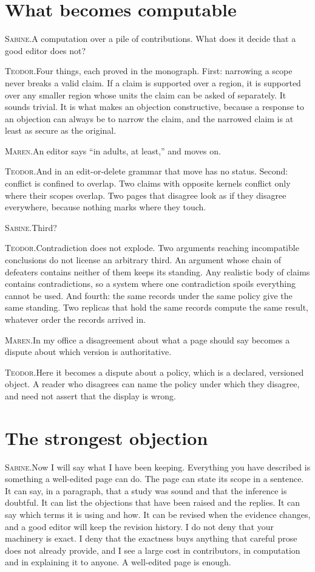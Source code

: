 \documentclass[11pt]{article}
\newcommand{\say}[2]{\par\noindent\textsc{#1.}\enspace #2\par}
\newcommand{\MA}[1]{\say{Maren}{#1}}
\newcommand{\TE}[1]{\say{Teodor}{#1}}
\newcommand{\SA}[1]{\say{Sabine}{#1}}
\begin{document}
\section{What becomes computable}

\SA{A computation over a pile of contributions. What does it decide that a good editor does not?}

\TE{Four things, each proved in the monograph. First: narrowing a scope never breaks a valid claim. If a claim is supported over a region, it is supported over any smaller region whose units the claim can be asked of separately. It sounds trivial. It is what makes an objection constructive, because a response to an objection can always be to narrow the claim, and the narrowed claim is at least as secure as the original.}

\MA{An editor says ``in adults, at least,'' and moves on.}

\TE{And in an edit-or-delete grammar that move has no status. Second: conflict is confined to overlap. Two claims with opposite kernels conflict only where their scopes overlap. Two pages that disagree look as if they disagree everywhere, because nothing marks where they touch.}

\SA{Third?}

\TE{Contradiction does not explode. Two arguments reaching incompatible conclusions do not license an arbitrary third. An argument whose chain of defeaters contains neither of them keeps its standing. Any realistic body of claims contains contradictions, so a system where one contradiction spoils everything cannot be used. And fourth: the same records under the same policy give the same standing. Two replicas that hold the same records compute the same result, whatever order the records arrived in.}

\MA{In my office a disagreement about what a page should say becomes a dispute about which version is authoritative.}

\TE{Here it becomes a dispute about a policy, which is a declared, versioned object. A reader who disagrees can name the policy under which they disagree, and need not assert that the display is wrong.}

\section{The strongest objection}

\SA{Now I will say what I have been keeping. Everything you have described is something a well-edited page can do. The page can state its scope in a sentence. It can say, in a paragraph, that a study was sound and that the inference is doubtful. It can list the objections that have been raised and the replies. It can say which terms it is using and how. It can be revised when the evidence changes, and a good editor will keep the revision history. I do not deny that your machinery is exact. I deny that the exactness buys anything that careful prose does not already provide, and I see a large cost in contributors, in computation and in explaining it to anyone. A well-edited page is enough.}
\end{document}
